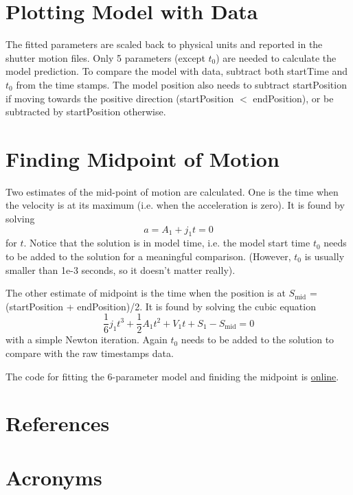 \documentclass[CTN,lsstdraft,authoryear,toc]{lsstdoc}
\newcommand{\eq}[1]{\begin{equation}#1\end{equation}}
\begin{document}
\section{Plotting Model with Data}
The fitted parameters are scaled back to physical units and reported in the shutter motion files. Only 5 parameters (except $t_0$) are needed to calculate the model prediction. To compare the model with data, subtract both startTime and $t_0$ from the time stamps. The model position also needs to subtract startPosition if moving towards the positive direction (startPosition $<$ endPosition), or be subtracted by startPosition otherwise.

\section{Finding Midpoint of Motion}
Two estimates of the mid-point of motion are calculated. One is the time when the velocity is at its maximum (i.e. when the acceleration is zero). It is found by solving
\eq{
    a = A_1 + j_1 t = 0
}
for $t$. Notice that the solution is in model time, i.e. the model start time $t_0$ needs to be added to the solution for a meaningful comparison. (However, $t_0$ is usually smaller than 1e-3 seconds, so it doesn't matter really).

The other estimate of midpoint is the time when the position is at $S_{\mathrm{mid}}$ = (startPosition + endPosition)/2. It is found by solving the cubic equation
\eq{
    \frac{1}{6}j_1 t^3 + \frac{1}{2}A_1 t^2 + V_1 t + S_1 - S_{\mathrm{mid}} = 0
}
with a simple Newton iteration. Again $t_0$ needs to be added to the solution to compare with the raw timestamps data.

The code for fitting the 6-parameter model and finiding the midpoint is
\href{https://github.com/shuang92/StandaloneJavaShutterFitter/blob/main/src/main/java/org/lsst/ccs/standalone/shutter/fitter/StandaloneJavaShutterFitter.java}{online}.


\appendix
\section{References} \label{sec:bib}
\renewcommand{\refname}{} %


\section{Acronyms} \label{sec:acronyms}

\end{document}
